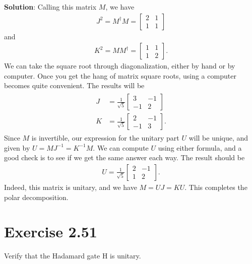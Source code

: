 \documentclass{book}
\begin{document}
    \textbf{Solution}: Calling this matrix $M$, we have
    \begin{align}
        J^2 = M^\dagger M = \begin{bmatrix}
            2 & 1 \\
            1 & 1
        \end{bmatrix}
    \end{align}
    and
    \begin{align}
        K^2 = M M^\dagger = \begin{bmatrix}
            1 & 1 \\
            1 & 2
        \end{bmatrix}.
    \end{align}
    We can take the square root through diagonalization, either by hand or by computer. Once you get the hang of matrix square roots, using a computer becomes quite convenient. The results will be
    \begin{align}
    \begin{aligned}
        J &= \frac{1}{\sqrt{5}}\begin{bmatrix}
            3 & -1 \\
            -1 & 2
        \end{bmatrix} \\
        K &= \frac{1}{\sqrt{5}} \begin{bmatrix}
            2 & -1 \\
            -1 & 3
        \end{bmatrix}.
    \end{aligned}
    \end{align}
    Since $M$ is invertible, our expression for the unitary part $U$ will be unique, and given by $U = M J^{-1} = K^{-1} M$. We can compute $U$ using either formula, and a good check is to see if we get the same answer each way. The result should be
    \begin{align}
        U = \frac{1}{\sqrt{5}}\begin{bmatrix}
            2 & -1 \\
            1 & 2
        \end{bmatrix}.
    \end{align}
    Indeed, this matrix is unitary, and we have $M = UJ = KU$. This completes the polar decomposition.
    
\section*{Exercise 2.51}
    Verify that the Hadamard gate H is unitary.
    
\end{document}
